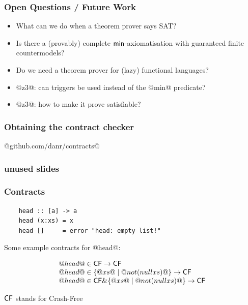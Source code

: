 \documentclass[serif,professionalfont]{beamer}
\begin{document}
\begin{frame}
  \frametitle{Open Questions / Future Work}

    \begin{itemize}

      \item What can we do when a theorem prover says SAT?

      \item Is there a (provably) complete $\mathsf{min}$-axiomatisation with
        guaranteed finite countermodels?

      \item Do we need a theorem prover for (lazy) functional languages?

      \item @z3@: can triggers be used instead of the @min@ predicate?

      \item @z3@: how to make it prove satisfiable?

    \end{itemize}

\end{frame}

\begin{frame}[fragile]
  \frametitle{Obtaining the contract checker}
    \begin{center}
      {\huge @github.com/danr/contracts@}
    \end{center}
\end{frame}

\begin{frame}[fragile]
  \frametitle{unused slides}

\end{frame}

\begin{frame}[fragile]
  \frametitle{Contracts}
  \begin{verbatim}
    head :: [a] -> a
    head (x:xs) = x
    head []     = error "head: empty list!"
  \end{verbatim}

  Some example contracts for @head@:

  \[\begin{array}{l}
    @head@ \in \mathsf{CF} \to \mathsf{CF} \\
    @head@ \in \{ @xs@ \mid @not (null xs)@ \} \to \mathsf{CF} \\
    @head@ \in \mathsf{CF} \& \{ @xs@ \mid @not (null xs)@ \} \to \mathsf{CF}
  \end{array}\]

  $\mathsf{CF}$ stands for Crash-Free
\end{frame}
\end{document}
